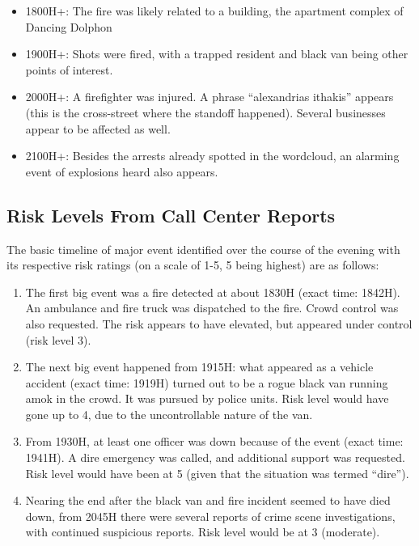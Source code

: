 \documentclass{acm_proc_article-sp}
\providecommand{\tightlist}{%
  \setlength{\itemsep}{0pt}\setlength{\parskip}{0pt}}
\begin{document}
\begin{itemize}
\tightlist
\item
  1800H+: The fire was likely related to a building, the apartment
  complex of Dancing Dolphon
\item
  1900H+: Shots were fired, with a trapped resident and black van being
  other points of interest.
\item
  2000H+: A firefighter was injured. A phrase ``alexandrias ithakis''
  appears (this is the cross-street where the standoff happened).
  Several businesses appear to be affected as well.
\item
  2100H+: Besides the arrests already spotted in the wordcloud, an
  alarming event of explosions heard also appears.
\end{itemize}

\hypertarget{risk-levels-from-call-center-reports}{%
\subsection{Risk Levels From Call Center
Reports}\label{risk-levels-from-call-center-reports}}

The basic timeline of major event identified over the course of the
evening with its respective risk ratings (on a scale of 1-5, 5 being
highest) are as follows:

\begin{enumerate}
\def\labelenumi{\arabic{enumi}.}
\item
  The first big event was a fire detected at about 1830H (exact time:
  1842H). An ambulance and fire truck was dispatched to the fire. Crowd
  control was also requested. The risk appears to have elevated, but
  appeared under control (risk level 3).
\item
  The next big event happened from 1915H: what appeared as a vehicle
  accident (exact time: 1919H) turned out to be a rogue black van
  running amok in the crowd. It was pursued by police units. Risk level
  would have gone up to 4, due to the uncontrollable nature of the van.
\item
  From 1930H, at least one officer was down because of the event (exact
  time: 1941H). A dire emergency was called, and additional support was
  requested. Risk level would have been at 5 (given that the situation
  was termed ``dire'').
\item
  Nearing the end after the black van and fire incident seemed to have
  died down, from 2045H there were several reports of crime scene
  investigations, with continued suspicious reports. Risk level would be
  at 3 (moderate).
\end{enumerate}
\end{document}
